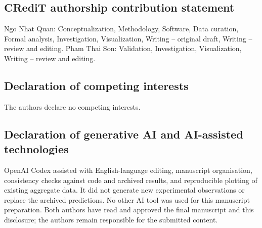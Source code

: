 \documentclass[11pt,a4paper]{article}
\begin{document}
\subsection*{CRediT authorship contribution statement}

Ngo Nhat Quan: Conceptualization, Methodology, Software, Data curation, Formal analysis,
Investigation, Visualization, Writing -- original draft, Writing -- review and editing. Pham Thai Son:
Validation, Investigation, Visualization, Writing -- review and editing.

\subsection*{Declaration of competing interests}

The authors declare no competing interests.

\subsection*{Declaration of generative AI and AI-assisted technologies}

OpenAI Codex assisted with English-language editing, manuscript organisation, consistency checks
against code and archived results, and reproducible plotting of existing aggregate data. It did not
generate new experimental observations or replace the archived predictions. No other AI tool was used
for this manuscript preparation. Both authors have read and approved the final manuscript and this
disclosure; the authors remain responsible for the submitted content.

\begingroup
\small


\endgroup
\end{document}
